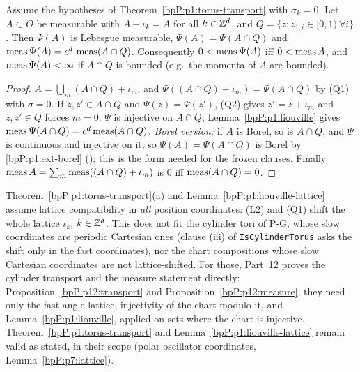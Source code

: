 \begin{lemma}\label{bpP:p1:liouville-lattice}
Assume the hypotheses of Theorem~\ref{bpP:p1:torus-transport} with $\sigma_k=0$. Let $A\subset O$ be measurable with $A+\iota_k=A$ for all $k\in\mathbb{Z}^d$, and $Q=\{z:z_{1,i}\in[0,1)\ \forall i\}$. Then $\Psi(A)$ is Lebesgue measurable, $\Psi(A)=\Psi(A\cap Q)$ and $\operatorname{meas}\Psi(A)=c^d\,\operatorname{meas}(A\cap Q)$. Consequently $0<\operatorname{meas}\Psi(A)$ iff $0<\operatorname{meas} A$, and $\operatorname{meas}\Psi(A)<\infty$ if $A\cap Q$ is bounded (e.g.\ the momenta of $A$ are bounded).
\end{lemma}
\begin{proof}
$A=\bigcup_{m}(A\cap Q)+\iota_m$, and $\Psi((A\cap Q)+\iota_m)=\Psi(A\cap Q)$ by (Q1) with $\sigma=0$. If $z,z'\in A\cap Q$ and $\Psi(z)=\Psi(z')$, (Q2) gives $z'=z+\iota_m$ and $z,z'\in Q$ forces $m=0$: $\Psi$ is injective on $A\cap Q$; Lemma~\ref{bpP:p1:liouville} gives $\operatorname{meas}\Psi(A\cap Q)=c^d\operatorname{meas}(A\cap Q)$. \emph{Borel version:} if $A$ is Borel, so is $A\cap Q$, and $\Psi$ is continuous and injective on it, so $\Psi(A)=\Psi(A\cap Q)$ is Borel by \ref{bpP:p1:ext-borel} (); this is the form needed for the frozen  clauses. Finally $\operatorname{meas} A=\sum_m\operatorname{meas}((A\cap Q)+\iota_m)$ is $0$ iff $\operatorname{meas}(A\cap Q)=0$.
\end{proof}

\begin{remark}\label{bpP:p1:cyl-scope}
Theorem~\ref{bpP:p1:torus-transport}(a) and Lemma~\ref{bpP:p1:liouville-lattice} assume lattice compatibility in \emph{all} position coordinates: (L2) and (Q1) shift the whole lattice $\iota_k$, $k\in\mathbb{Z}^d$. This does not fit the cylinder tori of P-G, whose slow coordinates are periodic Cartesian ones (clause (iii) of \texttt{IsCylinderTorus} asks the shift only in the fast coordinates), nor the chart compositions whose slow Cartesian coordinates are not lattice-shifted. For those, Part~12 proves the cylinder transport and the measure statement directly: Proposition~\ref{bpP:p12:transport} and Proposition~\ref{bpP:p12:measure}; they need only the fast-angle lattice, injectivity of the chart modulo it, and Lemma~\ref{bpP:p1:liouville}, applied on sets where the chart is injective. Theorem~\ref{bpP:p1:torus-transport} and Lemma~\ref{bpP:p1:liouville-lattice} remain valid as stated, in their scope (polar oscillator coordinates, Lemma~\ref{bpP:p7:lattice}).
\end{remark}

